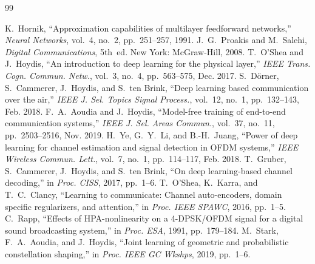 \documentclass[a4paper,14pt]{extreport}
\begin{document}
\begin{thebibliography}{99}




K.~Hornik, ``Approximation capabilities of multilayer feedforward networks,'' \emph{Neural Networks}, vol.~4, no.~2, pp.~251--257, 1991.
J.~G.~Proakis and M.~Salehi, \emph{Digital Communications}, 5th~ed. New York: McGraw-Hill, 2008.
T.~O'Shea and J.~Hoydis, ``An introduction to deep learning for the physical layer,'' \emph{IEEE Trans. Cogn. Commun. Netw.}, vol.~3, no.~4, pp.~563--575, Dec. 2017.
S.~D\"{o}rner, S.~Cammerer, J.~Hoydis, and S.~ten Brink, ``Deep learning based communication over the air,'' \emph{IEEE J. Sel. Topics Signal Process.}, vol.~12, no.~1, pp.~132--143, Feb. 2018.
F.~A.~Aoudia and J.~Hoydis, ``Model-free training of end-to-end communication systems,'' \emph{IEEE J. Sel. Areas Commun.}, vol.~37, no.~11, pp.~2503--2516, Nov. 2019.
H.~Ye, G.~Y.~Li, and B.-H.~Juang, ``Power of deep learning for channel estimation and signal detection in OFDM systems,'' \emph{IEEE Wireless Commun. Lett.}, vol.~7, no.~1, pp.~114--117, Feb. 2018.
T.~Gruber, S.~Cammerer, J.~Hoydis, and S.~ten Brink, ``On deep learning-based channel decoding,'' in \emph{Proc. CISS}, 2017, pp.~1--6.
T.~O'Shea, K.~Karra, and T.~C.~Clancy, ``Learning to communicate: Channel auto-encoders, domain specific regularizers, and attention,'' in \emph{Proc. IEEE SPAWC}, 2016, pp.~1--5.
C.~Rapp, ``Effects of HPA-nonlinearity on a 4-DPSK/OFDM signal for a digital sound broadcasting system,'' in \emph{Proc. ESA}, 1991, pp.~179--184.
M.~Stark, F.~A.~Aoudia, and J.~Hoydis, ``Joint learning of geometric and probabilistic constellation shaping,'' in \emph{Proc. IEEE GC Wkshps}, 2019, pp.~1--6.

\end{thebibliography}


\appendix
\end{document}
